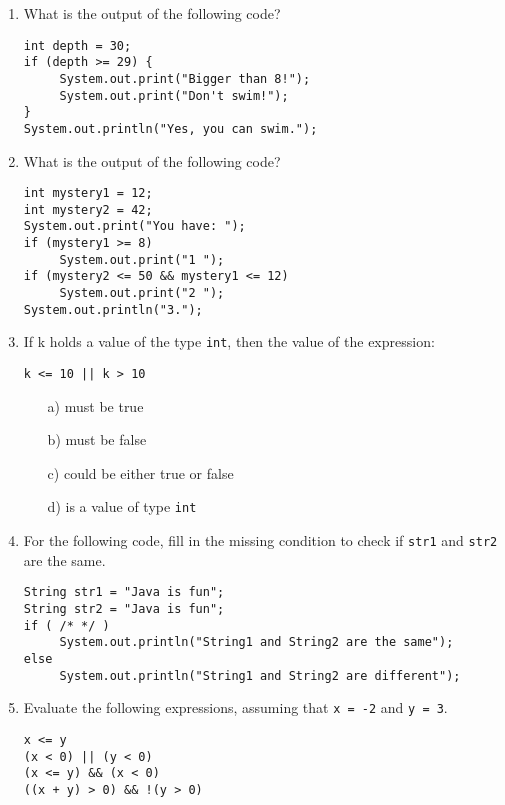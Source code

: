 \setcounter{counter}{1}
\begin{enumerate}[label={\arabic{counter}\addtocounter{counter}{1}}.]

\item What is the output of the following code?
\begin{lstlisting}
int depth = 30;
if (depth >= 29) {
     System.out.print("Bigger than 8!");
     System.out.print("Don't swim!");
}
System.out.println("Yes, you can swim.");
\end{lstlisting}

\item What is the output of the following code?
\begin{lstlisting}
int mystery1 = 12;
int mystery2 = 42;
System.out.print("You have: ");
if (mystery1 >= 8)
     System.out.print("1 ");
if (mystery2 <= 50 && mystery1 <= 12)
     System.out.print("2 ");
System.out.println("3.");
\end{lstlisting}

\item If k holds a value of the type \verb|int|, then the value of the expression:
\begin{lstlisting}
k <= 10 || k > 10
\end{lstlisting}
\begin{enumerate}
\item[a)] must be true
\item[b)] must be false
\item[c)] could be either true or false
\item[d)] is a value of type \verb|int|
\end{enumerate}

\item For the following code, fill in the missing condition to check if \verb|str1| and \verb|str2| are the same.
\begin{lstlisting}
String str1 = "Java is fun";
String str2 = "Java is fun";
if ( /* */ )
     System.out.println("String1 and String2 are the same");
else
     System.out.println("String1 and String2 are different");
\end{lstlisting}

\item Evaluate the following expressions, assuming that \verb|x = -2| and \verb|y = 3|.
\begin{lstlisting} 
x <= y 
(x < 0) || (y < 0)
(x <= y) && (x < 0)
((x + y) > 0) && !(y > 0)
\end{lstlisting}


\end{enumerate}
